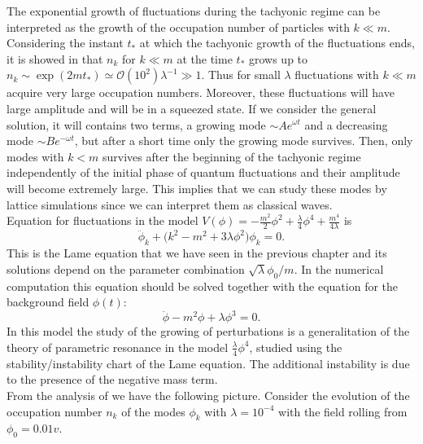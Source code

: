 \documentclass[11pt,a4paper,twoside]{book}
\begin{document}
 The exponential growth of fluctuations during the tachyonic regime can be interpreted as the growth of the occupation number of particles with $ k \ll m $. Considering the instant $ t_{*} $ at which the tachyonic growth of the fluctuations ends, it is showed in \cite{Chap5:TachyonicInstability} that $ n_{k} $ for $ k \ll m  $ at the time $ t_{*} $ grows up to $ n_{k} \sim \exp(2mt_{*})  \simeq \mathcal{O}(10^{2})\lambda^{-1} \gg 1$. Thus for small $ \lambda $  fluctuations with $ k \ll m $ acquire very large occupation numbers. Moreover, these fluctuations will have large amplitude  and will be in a squeezed state. If we consider the general solution, it will contains two terms, a growing mode $\sim Ae^{\omega t}$ and a decreasing mode $ \sim Be^{-\omega t} $, but after a short time only the growing mode survives. Then, only modes with $ k < m $ survives after the beginning of the tachyonic regime independently of the initial phase of quantum fluctuations and their amplitude will become extremely large. This implies that we can study these modes by lattice simulations since we can interpret them as classical waves. \\
Equation for fluctuations in the model $ V(\phi)=-\frac{m^{2}}{2}\phi^{2} + \frac{\lambda}{4}\phi^{4} + \frac{m^{4}}{4\lambda} $ is 
\begin{equation}
\label{Chap5:equationFluctuation}
\ddot{\phi}_{k} + \Bigg(k^{2} -m^{2} +3\lambda\phi^{2}\Bigg) \phi_{k} = 0.
\end{equation}
This is the Lame equation that we have seen in the previous chapter and its solutions depend on the parameter combination $ \sqrt{\lambda}\phi_{0}/m  $.
In the numerical computation this equation should be solved together with the equation for the background field $\phi(t)$:
\begin{equation}
\label{Chap5:equationBackground}
\ddot{\phi} - m^{2}\phi + \lambda \phi^{3} = 0.
\end{equation}
In this model the study of the growing of  perturbations is a generalitation of the theory of parametric resonance in the model $ \frac{\lambda}{4}\phi^{4} $, studied using the stability/instability chart of the Lame equation. The additional instability is due to the presence of the negative mass term.\\
From the analysis of \cite{Chap5:TachyonicInstability} we have the following picture. Consider the evolution of the occupation number $ n_{k} $ of the modes $ \phi_{k}  $ with $ \lambda = 10^{-4} $ with the field rolling from $ \phi_{0}=0.01v $.
\end{document}
